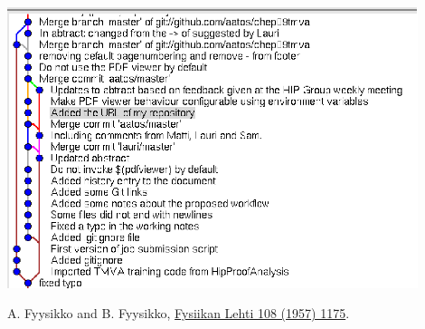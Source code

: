 \documentclass[12pt]{article}
\begin{document}
\includegraphics[width=12cm]{history.eps}


\begin{thebibliography}{9}

A. Fyysikko and B. Fyysikko,
\href{http://link.aps.org/abstract/PR/v108/p1175}{Fysiikan Lehti 108
(1957) 1175}.
\end{thebibliography}
\end{document}
